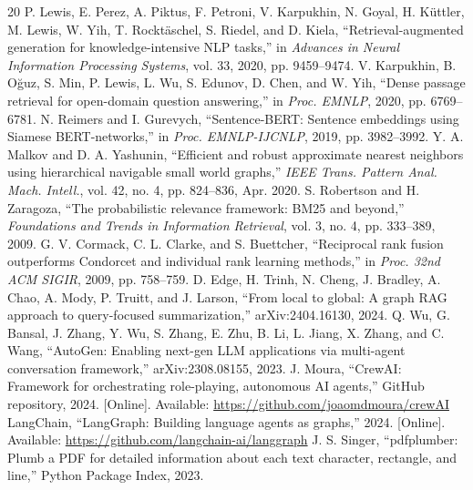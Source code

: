 \documentclass[conference]{IEEEtran}
\begin{document}
\begin{thebibliography}{20}
P. Lewis, E. Perez, A. Piktus, F. Petroni, V. Karpukhin, N. Goyal, H. K\"uttler, M. Lewis, W. Yih, T. Rockt\"aschel, S. Riedel, and D. Kiela, ``Retrieval-augmented generation for knowledge-intensive NLP tasks,'' in \textit{Advances in Neural Information Processing Systems}, vol. 33, 2020, pp. 9459--9474.
V. Karpukhin, B. O\u{g}uz, S. Min, P. Lewis, L. Wu, S. Edunov, D. Chen, and W. Yih, ``Dense passage retrieval for open-domain question answering,'' in \textit{Proc. EMNLP}, 2020, pp. 6769--6781.
N. Reimers and I. Gurevych, ``Sentence-BERT: Sentence embeddings using Siamese BERT-networks,'' in \textit{Proc. EMNLP-IJCNLP}, 2019, pp. 3982--3992.
Y. A. Malkov and D. A. Yashunin, ``Efficient and robust approximate nearest neighbors using hierarchical navigable small world graphs,'' \textit{IEEE Trans. Pattern Anal. Mach. Intell.}, vol. 42, no. 4, pp. 824--836, Apr. 2020.
S. Robertson and H. Zaragoza, ``The probabilistic relevance framework: BM25 and beyond,'' \textit{Foundations and Trends in Information Retrieval}, vol. 3, no. 4, pp. 333--389, 2009.
G. V. Cormack, C. L. Clarke, and S. Buettcher, ``Reciprocal rank fusion outperforms Condorcet and individual rank learning methods,'' in \textit{Proc. 32nd ACM SIGIR}, 2009, pp. 758--759.
D. Edge, H. Trinh, N. Cheng, J. Bradley, A. Chao, A. Mody, P. Truitt, and J. Larson, ``From local to global: A graph RAG approach to query-focused summarization,'' arXiv:2404.16130, 2024.
Q. Wu, G. Bansal, J. Zhang, Y. Wu, S. Zhang, E. Zhu, B. Li, L. Jiang, X. Zhang, and C. Wang, ``AutoGen: Enabling next-gen LLM applications via multi-agent conversation framework,'' arXiv:2308.08155, 2023.
J. Moura, ``CrewAI: Framework for orchestrating role-playing, autonomous AI agents,'' GitHub repository, 2024. [Online]. Available: \url{https://github.com/joaomdmoura/crewAI}
LangChain, ``LangGraph: Building language agents as graphs,'' 2024. [Online]. Available: \url{https://github.com/langchain-ai/langgraph}
J. S. Singer, ``pdfplumber: Plumb a PDF for detailed information about each text character, rectangle, and line,'' Python Package Index, 2023.

\end{thebibliography}
\end{document}
